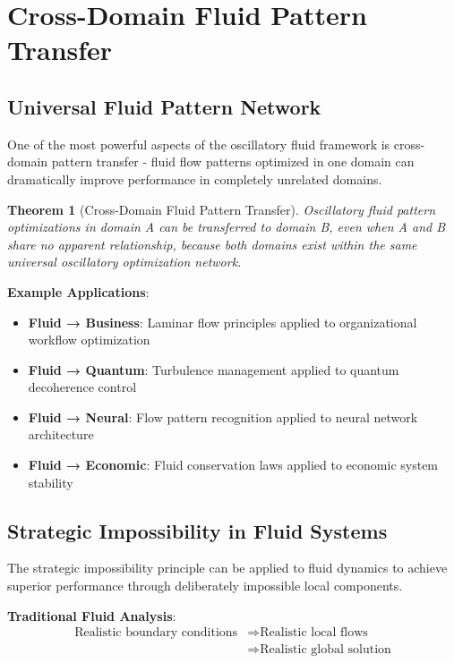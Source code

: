 \documentclass[12pt,a4paper]{article}
\newtheorem{theorem}{Theorem}
\begin{document}
\section{Cross-Domain Fluid Pattern Transfer}

\subsection{Universal Fluid Pattern Network}

One of the most powerful aspects of the oscillatory fluid framework is cross-domain pattern transfer - fluid flow patterns optimized in one domain can dramatically improve performance in completely unrelated domains.

\begin{theorem}[Cross-Domain Fluid Pattern Transfer]
Oscillatory fluid pattern optimizations in domain A can be transferred to domain B, even when A and B share no apparent relationship, because both domains exist within the same universal oscillatory optimization network.
\end{theorem}

\textbf{Example Applications}:
\begin{itemize}
\item \textbf{Fluid → Business}: Laminar flow principles applied to organizational workflow optimization
\item \textbf{Fluid → Quantum}: Turbulence management applied to quantum decoherence control
\item \textbf{Fluid → Neural}: Flow pattern recognition applied to neural network architecture
\item \textbf{Fluid → Economic}: Fluid conservation laws applied to economic system stability
\end{itemize}

\subsection{Strategic Impossibility in Fluid Systems}

The strategic impossibility principle can be applied to fluid dynamics to achieve superior performance through deliberately impossible local components.

\textbf{Traditional Fluid Analysis}:
\begin{align}
\text{Realistic boundary conditions} &\Rightarrow \text{Realistic local flows} \\
&\Rightarrow \text{Realistic global solution}
\end{align}
\end{document}
